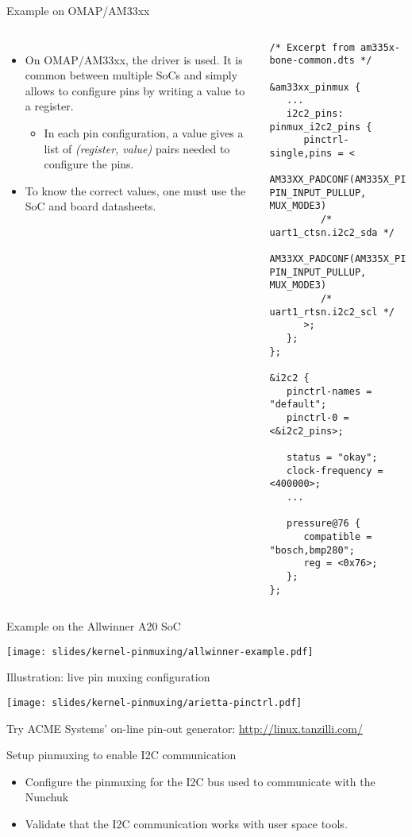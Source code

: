 \begin{frame}[fragile]{Example on OMAP/AM33xx}
  \begin{columns}
    \begin{itemize}
      \small
    \item On OMAP/AM33xx, the  driver is used. It
      is common between multiple SoCs and simply allows to configure
      pins by writing a value to a register.
      \begin{itemize}
      \item In each pin configuration, a  value
        gives a list of {\em (register, value)} pairs needed to configure
        the pins.
      \end{itemize}
    \item To know the correct values, one must use the SoC and board
      datasheets.
    \end{itemize}
    \begin{verbatim}
/* Excerpt from am335x-bone-common.dts */

&am33xx_pinmux {
   ...
   i2c2_pins: pinmux_i2c2_pins {
      pinctrl-single,pins = <
         AM33XX_PADCONF(AM335X_PIN_UART1_CTSN, PIN_INPUT_PULLUP, MUX_MODE3)
         /* uart1_ctsn.i2c2_sda */
         AM33XX_PADCONF(AM335X_PIN_UART1_RTSN, PIN_INPUT_PULLUP, MUX_MODE3)
         /* uart1_rtsn.i2c2_scl */
      >;
   };
};

&i2c2 {
   pinctrl-names = "default";
   pinctrl-0 = <&i2c2_pins>;

   status = "okay";
   clock-frequency = <400000>;
   ...

   pressure@76 {
      compatible = "bosch,bmp280";
      reg = <0x76>;
   };
};
    \end{verbatim}
  \end{columns}
\end{frame}

\begin{frame}[fragile]{Example on the Allwinner A20 SoC}
  \begin{center}
    \texttt{[image: slides/kernel-pinmuxing/allwinner-example.pdf]}
  \end{center}
\end{frame}

\begin{frame}[fragile]{Illustration: live pin muxing configuration}
  \begin{center}
    \texttt{[image: slides/kernel-pinmuxing/arietta-pinctrl.pdf]}
  \end{center}
  Try ACME Systems' on-line pin-out generator: \url{http://linux.tanzilli.com/}
\end{frame}

\setuplabframe
{Setup pinmuxing to enable I2C communication}
{
  \begin{itemize}
  \item Configure the pinmuxing for the I2C bus used to communicate
    with the Nunchuk
  \item Validate that the I2C communication works with user space
    tools.
  \end{itemize}
}
